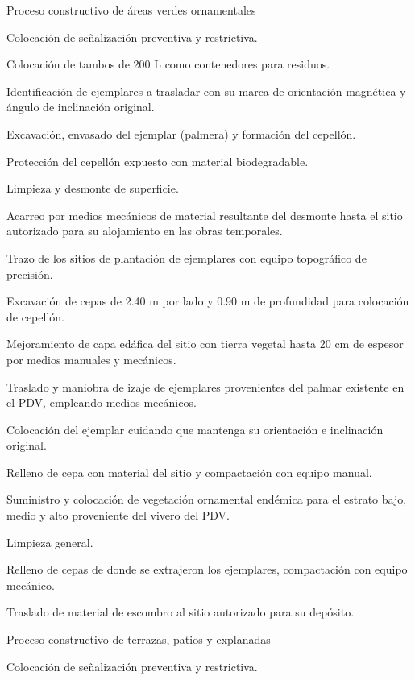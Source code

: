 \documentclass{article}
\begin{document}
\bigskip


\bigskip

Proceso constructivo de áreas verdes ornamentales


\bigskip

Colocación de señalización preventiva y restrictiva.

Colocación de tambos de 200 L como contenedores para residuos.

Identificación de ejemplares a trasladar con su marca de orientación magnética y ángulo de inclinación original.

Excavación, envasado del ejemplar (palmera) y formación del cepellón.

Protección del cepellón expuesto con material biodegradable.

Limpieza y desmonte de superficie. 

Acarreo por medios mecánicos de material resultante del desmonte hasta el sitio autorizado para su alojamiento en las obras temporales.

Trazo de los sitios de plantación de ejemplares con equipo topográfico de precisión.

Excavación de cepas de 2.40 m por lado y 0.90 m de profundidad para colocación de cepellón.

Mejoramiento de capa edáfica del sitio con tierra vegetal hasta 20 cm de espesor por medios manuales y mecánicos.

Traslado y maniobra de izaje de ejemplares provenientes del palmar existente en el PDV, empleando medios mecánicos.

Colocación del ejemplar cuidando que mantenga su orientación e inclinación original.

Relleno de cepa con material del sitio y compactación con equipo manual.

Suministro y colocación de vegetación ornamental endémica para el estrato bajo, medio y alto proveniente del vivero del PDV.

Limpieza general.

Relleno de cepas de donde se extrajeron los ejemplares, compactación con equipo mecánico.

Traslado de material de escombro al sitio autorizado para su depósito.


\bigskip


\bigskip

Proceso constructivo de terrazas, patios y explanadas


\bigskip

Colocación de señalización preventiva y restrictiva.
\end{document}
